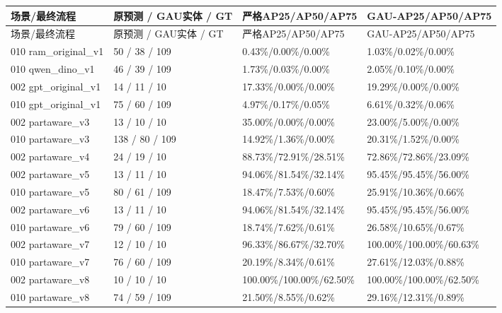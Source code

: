 \documentclass[UTF8,fontset=fandol]{ctexart}
\begin{document}
{\small
\begin{longtable}{|p{}|p{}|p{}|p{}|}
\hline
场景/最终流程 & 原预测 / GAU实体 / GT & 严格AP25/AP50/AP75 & GAU-AP25/AP50/AP75 \\ \hline
\endfirsthead
\hline
场景/最终流程 & 原预测 / GAU实体 / GT & 严格AP25/AP50/AP75 & GAU-AP25/AP50/AP75 \\ \hline
\endhead
010 ram\_original\_v1 & 50 / 38 / 109 & 0.43\%/0.00\%/0.00\% & 1.03\%/0.02\%/0.00\% \\ \hline
010 qwen\_dino\_v1 & 46 / 39 / 109 & 1.73\%/0.03\%/0.00\% & 2.05\%/0.10\%/0.00\% \\ \hline
002 gpt\_original\_v1 & 14 / 11 / 10 & 17.33\%/0.00\%/0.00\% & 19.29\%/0.00\%/0.00\% \\ \hline
010 gpt\_original\_v1 & 75 / 60 / 109 & 4.97\%/0.17\%/0.05\% & 6.61\%/0.32\%/0.06\% \\ \hline
002 partaware\_v3 & 13 / 10 / 10 & 35.00\%/0.00\%/0.00\% & 23.00\%/5.00\%/0.00\% \\ \hline
010 partaware\_v3 & 138 / 80 / 109 & 14.92\%/1.36\%/0.00\% & 20.31\%/1.52\%/0.00\% \\ \hline
002 partaware\_v4 & 24 / 19 / 10 & 88.73\%/72.91\%/28.51\% & 72.86\%/72.86\%/23.09\% \\ \hline
002 partaware\_v5 & 13 / 11 / 10 & 94.06\%/81.54\%/32.14\% & 95.45\%/95.45\%/56.00\% \\ \hline
010 partaware\_v5 & 80 / 61 / 109 & 18.47\%/7.53\%/0.60\% & 25.91\%/10.36\%/0.66\% \\ \hline
002 partaware\_v6 & 13 / 11 / 10 & 94.06\%/81.54\%/32.14\% & 95.45\%/95.45\%/56.00\% \\ \hline
010 partaware\_v6 & 79 / 60 / 109 & 18.74\%/7.62\%/0.61\% & 26.58\%/10.65\%/0.67\% \\ \hline
002 partaware\_v7 & 12 / 10 / 10 & 96.33\%/86.67\%/32.70\% & 100.00\%/100.00\%/60.63\% \\ \hline
010 partaware\_v7 & 76 / 60 / 109 & 20.19\%/8.34\%/0.61\% & 27.61\%/12.03\%/0.88\% \\ \hline
002 partaware\_v8 & 10 / 10 / 10 & 100.00\%/100.00\%/62.50\% & 100.00\%/100.00\%/62.50\% \\ \hline
010 partaware\_v8 & 74 / 59 / 109 & 21.50\%/8.55\%/0.62\% & 29.16\%/12.31\%/0.89\% \\ \hline

\end{longtable}}
\end{document}
